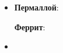 \documentclass[12pt]{kiarticle}
\begin{document}
\begin{enumerate}
\begin{itemize}
  		
  	\item	\textbf{Пермаллой}:
  	
  		
  		\textbf{Феррит}:
  		
  	\item	{}
  		
  	\end{itemize}
  		
  	\end{enumerate}
\end{document}
